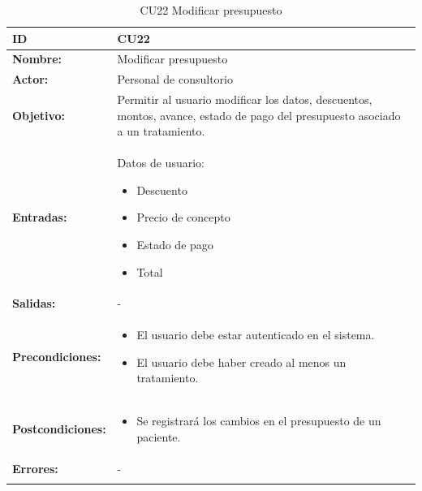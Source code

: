 \begin{longtable}[H]{|p{}|p{12cm}|}
\hline\textbf{ID}         
& \textbf{CU22}            \\ \hline
\textbf{Nombre:}          
& Modificar presupuesto      \\ \hline
\textbf{Actor:}          
& Personal de consultorio   \\ \hline
\textbf{Objetivo:}       
& Permitir al usuario modificar los datos, descuentos, montos, avance, estado de pago del presupuesto asociado a un tratamiento.\\ \hline
\textbf{Entradas:}  & 
Datos de usuario:
\begin{itemize}[nosep]
\item Descuento
\item Precio de concepto
\item Estado de pago
\item Total
\end{itemize}
\\ \hline
\textbf{Salidas:}  & -
\\ \hline
\textbf{Precondiciones:}  &             
\begin{itemize}[nosep]
\item El usuario debe estar autenticado en el sistema.
\item El usuario debe haber creado al menos un tratamiento.
\end{itemize}
\\ \hline
\textbf{Postcondiciones:} & 
\begin{itemize}[nosep]
\item Se registrará los cambios en el presupuesto de un paciente.
\end{itemize}
\\ \hline
\textbf{Errores:} &  -
\\ \hline
\caption{CU22 Modificar presupuesto}
\label{table:1}
\end{longtable}

